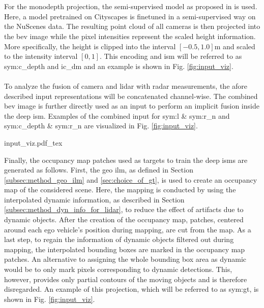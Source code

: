 \\\\
For the \gls{monodepth} projection, the semi-supervised model as proposed in \cite{guizilini2020robust} is used. Here, a model pretrained on Cityscapes is finetuned in a semi-supervised way on the NuScenes data. The resulting point cloud of all cameras is then projected into the \gls{bev} image while the pixel intensities represent the scaled height information. More specifically, the height is clipped into the interval $[-0.5,1.0]$m and scaled to the intensity interval $[0,1]$. This encoding and \gls{ism} will be referred to as \gls{sym:c_depth} and \gls{ic_dm} and an example is shown in Fig. \ref{fig:input_viz}.
\\\\
To analyze the fusion of camera and lidar with radar measurements, the afore described input representations will be concatenated channel-wise. The combined \gls{bev} image is further directly used as an input to perform an implicit fusion inside the deep \gls{ism}. Examples of the combined input for \gls{sym:l} \& \gls{sym:r_n} and \gls{sym:c_depth} \& \gls{sym:r_n} are visualized in Fig. \ref{fig:input_viz}.
\begin{center}
	{input_viz.pdf_tex}
\end{center}
Finally, the occupancy map patches used as targets to train the deep \gls{ism}s are generated as follows. First, the geo \gls{ilm}, as defined in Section \ref{subsec:method_geo_ilm} and \ref{sec:choice_of_gt}, is used to create an occupancy map of the considered scene. Here, the mapping is conducted by using the interpolated dynamic information, as described in Section \ref{subsec:method_dyn_info_for_lidar}, to reduce the effect of artifacts due to dynamic objects. After the creation of the occupancy map, patches, centered around each ego vehicle's position during mapping, are cut from the map. As a last step, to regain the information of dynamic objects filtered out during mapping, the interpolated bounding boxes are marked in the occupancy map patches. An alternative to assigning the whole bounding box area as dynamic would be to only mark pixels corresponding to dynamic detections. This, however, provides only partial contours of the moving objects and is therefore disregarded. An example of this projection, which will be referred to as \gls{sym:gt}, is shown in Fig. \ref{fig:input_viz}.
%
